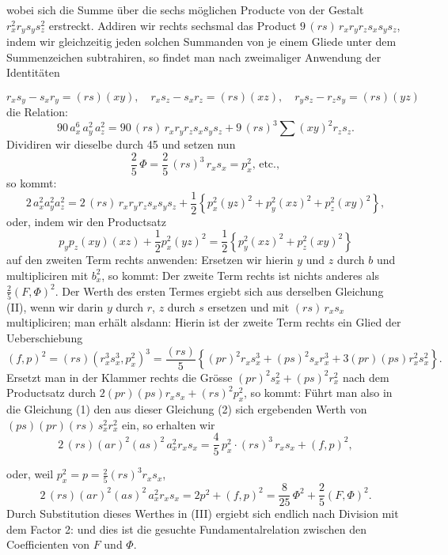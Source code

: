 wobei sich die Summe über die sechs möglichen Producte von der Gestalt $r_x^2 r_y s_y s_z^2$ erstreckt. Addiren wir rechts sechsmal das Product $9\,(rs)\,r_x r_y r_z s_x s_y s_z$, indem wir gleichzeitig jeden solchen Summanden von je einem Gliede unter dem Summenzeichen subtrahiren, so findet man nach zweimaliger Anwendung der Identitäten

\[
r_x s_y - s_x r_y = (rs)(xy), \quad r_x s_z - s_x r_z = (rs)(xz), \quad r_y s_z - r_z s_y = (rs)(yz)
\]
die Relation:
\[
90\,a_x^6\,a_y^2\,a_z^2 = 90\,(rs)\,r_x r_y r_z s_x s_y s_z + 9\,(rs)^3 \sum (xy)^2 r_z s_z.
\]
Dividiren wir dieselbe durch 45 und setzen nun
\[
\frac{2}{5}\,\Phi = \frac{2}{5}\,(rs)^3\,r_x s_x = p_x^2\text{, etc.},
\]
so kommt:
\[
2\,a_x^2 a_y^2 a_z^2 = 2\,(rs)\,r_x r_y r_z s_x s_y s_z + \frac{1}{2}\left\{ p_x^2 (yz)^2 + p_y^2 (xz)^2 + p_z^2 (xy)^2 \right\},
\]
oder, indem wir den Productsatz
\[
p_y p_z (xy)(xz) + \frac{1}{2} p_x^2 (yz)^2 = \frac{1}{2}\left\{ p_y^2(xz)^2 + p_z^2(xy)^2 \right\}
\]
auf den zweiten Term rechts anwenden:
Ersetzen wir hierin $y$ und $z$ durch $b$ und multipliciren mit $b_x^2$, so kommt:
Der zweite Term rechts ist nichts anderes als $\frac{2}{5}(F,\Phi)^2$. Der Werth des ersten Termes ergiebt sich aus derselben Gleichung (II), wenn wir darin $y$ durch $r$, $z$ durch $s$ ersetzen und mit $(rs)\,r_x s_x$ multipliciren; man erhält alsdann:
Hierin ist der zweite Term rechts ein Glied der Ueberschiebung
\[
(f,p)^2 = (rs)(r_x^3 s_x^3, p_x^2)^3 = \frac{(rs)}{5}\left\{ (pr)^2 r_x s_x^3 + (ps)^2 s_x r_x^3 + 3(pr)(ps) r_x^2 s_x^2 \right\}.
\]
Ersetzt man in der Klammer rechts die Grösse $(pr)^2 s_x^2 + (ps)^2 r_x^2$ nach dem Productsatz durch $2(pr)(ps) r_x s_x + (rs)^2 p_x^2$, so kommt:
Führt man also in die Gleichung (1) den aus dieser Gleichung (2) sich ergebenden Werth von $(ps)(pr)(rs)\,s_x^2 r_x^2$ ein, so erhalten wir
\[
2\,(rs)(ar)^2(as)^2\,a_x^2 r_x s_x = \frac{4}{5}\,p_x^2\cdot(rs)^3\,r_x s_x + (f,p)^2,
\]


oder, weil $p_x^2 = p = \frac{2}{5}(rs)^3 r_x s_x$,
\[
2\,(rs)(ar)^2(as)^2\,a_x^2 r_x s_x = 2p^2 + (f,p)^2 = \frac{8}{25}\,\Phi^2 + \frac{2}{5}(F,\Phi)^2.
\]
Durch Substitution dieses Werthes in (III) ergiebt sich endlich nach Division mit dem Factor 2:
und dies ist die gesuchte Fundamentalrelation zwischen den Coefficienten von $F$ und $\Phi$.

